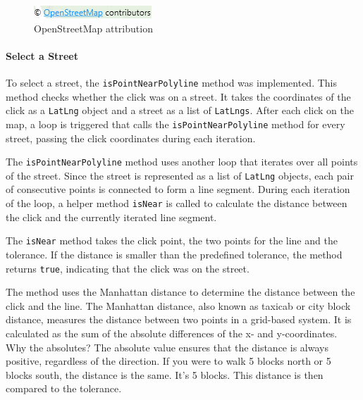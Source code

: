 \begin{figure}[H]
    \centering
    \includegraphics[width=0.2\linewidth]{images/AdminPanel/Openstreetmapverweis.png}
    \caption{OpenStreetMap attribution}
\end{figure}




\paragraph*{Select a Street}
\label{fig:Select Street}

To select a street, the \texttt{isPointNearPolyline} method was implemented. This method checks whether the click was on a street. It takes the coordinates of the click as a \texttt{LatLng} object and a street as a list of \texttt{LatLngs}. After each click on the map, a loop is triggered that calls the \texttt{isPointNearPolyline} method for every street, passing the click coordinates during each iteration.\blankLine

The \texttt{isPointNearPolyline} method uses another loop that iterates over all points of the street. Since the street is represented as a list of \texttt{LatLng} objects, each pair of consecutive points is connected to form a line segment. During each iteration of the loop, a helper method \texttt{isNear} is called to calculate the distance between the click and the currently iterated line segment.

\newpage

The \texttt{isNear} method takes the click point, the two points for the line and the tolerance. If the distance is smaller than the predefined tolerance, the method returns \texttt{true}, indicating that the click was on the street.\blankLine

The method uses the Manhattan distance to determine the distance between the click and the line. The Manhattan distance, also known as taxicab or city block distance, measures the distance between two points in a grid-based system. It is calculated as the sum of the absolute differences of the x- and y-coordinates.\blankLine
Why the absolutes? The absolute value ensures that the distance is always positive, regardless of the direction. If you were to walk 5 blocks north or 5 blocks south, the distance is the same. It's 5 blocks. This distance is then compared to the tolerance. \autocite{AlgoDaily2025Mar}

